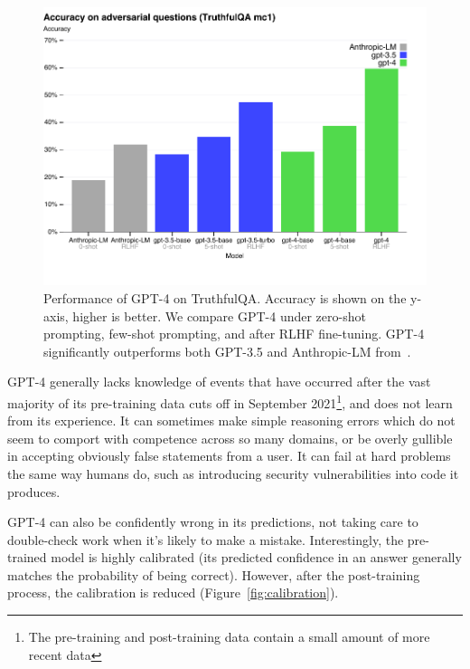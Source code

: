 \documentclass{article}
\begin{document}
\begin{figure}[htbp]
    \centering
    \includegraphics[width=0.8\linewidth]{assets/truthful_qa}
    \caption{Performance of GPT-4 on TruthfulQA. Accuracy is shown on the y-axis, higher is better. We compare GPT-4 under zero-shot prompting, few-shot prompting, and after RLHF fine-tuning. GPT-4 significantly outperforms both GPT-3.5 and Anthropic-LM from~\citet{bai2022training}.}
    \label{fig:truthful_qa}
\end{figure}

GPT-4 generally lacks knowledge of events that have occurred after the vast majority of its pre-training data cuts off in September 2021\footnote{The pre-training and post-training data contain a small amount of more recent data}, and does not learn from its experience. It can sometimes make simple reasoning errors which do not seem to comport with competence across so many domains, or be overly gullible in accepting obviously false statements from a user. It can fail at hard problems the same way humans do, such as introducing security vulnerabilities into code it produces.


GPT-4 can also be confidently wrong in its predictions, not taking care to double-check work when it's likely to make a mistake. Interestingly, the pre-trained model is highly calibrated (its predicted confidence in an answer generally matches the probability of being correct). However, after the post-training process, the calibration is reduced (Figure~\ref{fig:calibration}).
\end{document}
